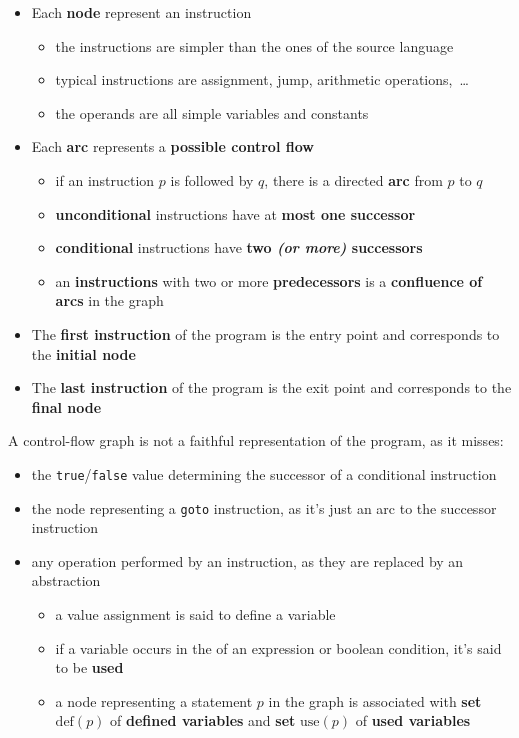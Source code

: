 \documentclass[english]{article}
\begin{document}
\begin{itemize}
  \item Each \textbf{node} represent an instruction
        \begin{itemize}
          \item the instructions are simpler than the ones of the source language
          \item typical instructions are assignment, jump, arithmetic operations, \,\ldots\,
          \item the operands are all simple variables and constants
        \end{itemize}
  \item Each \textbf{arc} represents a \textbf{possible control flow}
        \begin{itemize}
          \item if an instruction \(p\) is followed by \(q\), there is a directed \textbf{arc} from \(p\) to \(q\)
          \item \textbf{unconditional} instructions have at \textbf{most one successor}
          \item \textbf{conditional} instructions have \textbf{two \textit{(or more)} successors}
          \item an \textbf{instructions} with two or more \textbf{predecessors} is a \textbf{confluence of arcs} in the graph
        \end{itemize}
  \item The \textbf{first instruction} of the program is the entry point and corresponds to the \textbf{initial node}
  \item The \textbf{last instruction} of the program is the exit point and corresponds to the \textbf{final node}
\end{itemize}

A control-flow graph is not a faithful representation of the program, as it misses:

\begin{itemize}
  \item the \texttt{true}/\texttt{false} value determining the successor of a conditional instruction
  \item the node representing a \texttt{goto} instruction, as it's just an arc to the successor instruction
  \item any operation performed by an instruction, as they are replaced by an abstraction
        \begin{itemize}
          \item a value assignment is said to define a variable
          \item if a variable occurs in the \RP of an expression or boolean condition, it's said to be \textbf{used}
          \item a node representing a statement \(p\) in the graph is associated with \textbf{set} \(\text{def}(p)\) of \textbf{defined variables} and \textbf{set} \(\text{use}(p)\) of \textbf{used variables}
        \end{itemize}
\end{itemize}
\end{document}
